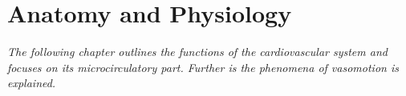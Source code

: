 \chapter{Anatomy and Physiology}
\textit{The following chapter outlines the functions of the cardiovascular system and focuses on its microcirculatory part. Further is the phenomena of vasomotion is explained.}